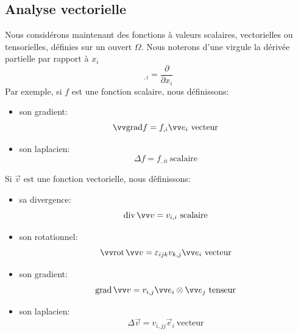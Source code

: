 \subsection{Analyse vectorielle} \label{ssec:AnnA:3.2}
Nous considérons maintenant des fonctions à valeurs scalaires, vectorielles ou tensorielles, définies sur un ouvert $\Omega$.
Nous noterons d'une virgule la dérivée partielle par rapport à $x_i$
\begin{equation}
    {}_{,i} = \frac{\partial}{\partial x_i}
    \label{eq:AnnA-054}
\end{equation}
Par exemple, si $f$ est une fonction scalaire, nous définissons:
\begin{itemize}
    \item son gradient:
        \begin{equation}
            \vec{\grad} f = f_{,i} \vec{e}_i \ \text{vecteur}
            \label{eq:AnnA-055}
        \end{equation}
    \item son laplacien:
        \begin{equation}
            \Delta f = f_{,ii} \ \text{scalaire}
            \label{eq:AnnA-056}
        \end{equation}
\end{itemize}
Si $\vec{v}$ est une fonction vectorielle, nous dêfinissons:
\begin{itemize}
    \item sa divergence:
        \begin{equation}
            \dive \vec{v} = v_{i,i} \ \text{scalaire}
            \label{eq:AnnA-057}
        \end{equation}
    \item son rotationnel:
        \begin{equation}
            \vec{\rot} \vec{v} = \varepsilon_{ijk} v_{k,j} \vec{e}_i \ \text{vecteur}
            \label{eq:AnnA-058}
        \end{equation}
    \item son gradient:
        \begin{equation}
            \grad \vec{v} = v_{i,j} \vec{e}_i \otimes \vec{e}_j \ \text{tenseur}
            \label{eq:AnnA-059}
        \end{equation}
    \item son laplacien:
        \begin{equation}
            \Delta \vec{v} = v_{i,jj} \vec{e}_i \ \text{vecteur}
            \label{eq:AnnA-060}
        \end{equation}
\end{itemize}
